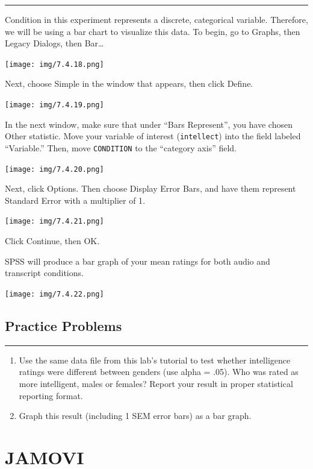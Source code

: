 \documentclass[]{book}
\begin{document}
\begin{center}\rule{0.5\linewidth}{0.5pt}\end{center}

Condition in this experiment represents a discrete, categorical
variable. Therefore, we will be using a bar chart to visualize this
data. To begin, go to {Graphs}, then {Legacy Dialogs}, then
{Bar\ldots{}}

\texttt{[image: img/7.4.18.png]}

Next, choose {Simple} in the window that appears, then click {Define}.

\texttt{[image: img/7.4.19.png]}

In the next window, make sure that under ``Bars Represent'', you have
chosen {Other statistic}. Move your variable of interest
(\texttt{intellect}) into the field labeled ``Variable.'' Then, move
\texttt{CONDITION} to the ``category axis'' field.

\texttt{[image: img/7.4.20.png]}

Next, click {Options}. Then choose {Display Error Bars}, and have them
represent {Standard Error} with a {multiplier of 1}.

\texttt{[image: img/7.4.21.png]}

Click {Continue}, then {OK}.

SPSS will produce a bar graph of your mean ratings for both audio and
transcript conditions.

\texttt{[image: img/7.4.22.png]}

\subsection{Practice Problems}\label{practice-problems-7}

\begin{center}\rule{0.5\linewidth}{0.5pt}\end{center}

\begin{enumerate}
\def\labelenumi{\arabic{enumi}.}
\item
  Use the same data file from this lab's tutorial to test whether
  intelligence ratings were different between genders (use alpha = .05).
  Who was rated as more intelligent, males or females? Report your
  result in proper statistical reporting format.
\item
  Graph this result (including 1 SEM error bars) as a bar graph.
\end{enumerate}

\section{JAMOVI}\label{jamovi-7}
\end{document}
